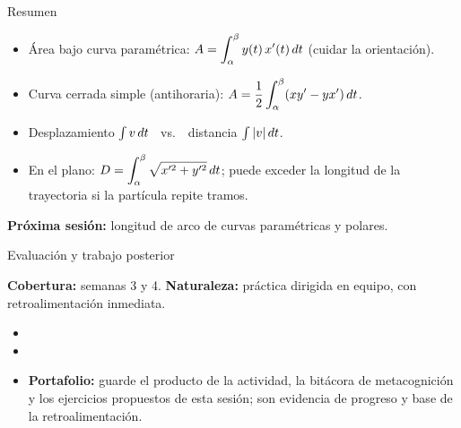 \documentclass[10pt,aspectratio=169]{beamer}
\begin{document}
\begin{frame}{Resumen}
  \begin{itemize}
    \item Área bajo curva paramétrica: $A=\displaystyle\int_\alpha^\beta y(t)\,x'(t)\,dt$ (cuidar la orientación).
    \item Curva cerrada simple (antihoraria): $A=\dfrac12\displaystyle\int_\alpha^\beta(xy'-yx')\,dt$.
    \item Desplazamiento $\int v\,dt$ \ vs.\ \ distancia $\int|v|\,dt$.
    \item En el plano: $D=\displaystyle\int_\alpha^\beta\sqrt{x'^2+y'^2}\,dt$; puede exceder la longitud de la trayectoria si
      la partícula repite tramos.
  \end{itemize}
  \vspace{3mm}
  \textbf{Próxima sesión:} longitud de arco de curvas paramétricas y polares.
\end{frame}


\begin{frame}{Evaluación y trabajo posterior}
  \small
  \begin{evalbox}
    \textbf{Cobertura:} semanas 3 y 4. \textbf{Naturaleza:} práctica dirigida en equipo, con retroalimentación inmediata.
  \end{evalbox}
  \begin{itemize}
    \item \criterios
    \item \declaracionia
    \item \textbf{Portafolio:} guarde el producto de la actividad, la bitácora de metacognición y los ejercicios propuestos de esta sesión; son evidencia de progreso y base de la retroalimentación.
  \end{itemize}
\end{frame}
\end{document}
